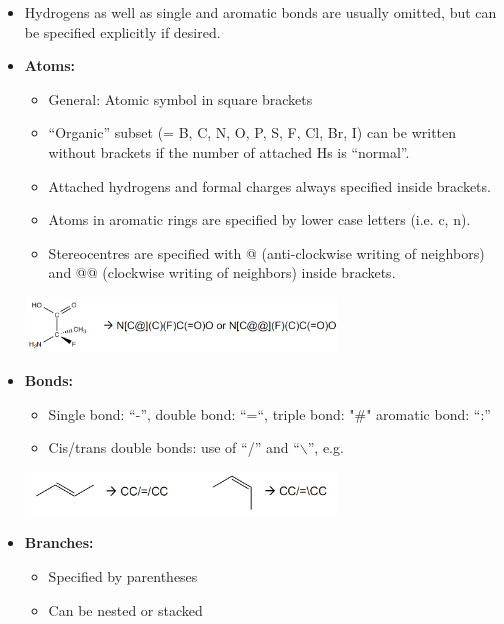 \begin{itemize}
    \item Hydrogens as well as single and aromatic bonds are usually omitted, but can be specified explicitly if desired.
    \item \textbf{Atoms:}
    \begin{itemize}
        \item General: Atomic symbol in square brackets
        \item “Organic” subset (= B, C, N, O, P, S, F, Cl, Br, I) can be written without brackets if the number of attached Hs is “normal”.
        \item Attached hydrogens and formal charges always specified inside brackets.
        \item Atoms in aromatic rings are specified by lower case letters (i.e. c, n).
        \item Stereocentres are specified with @ (anti-clockwise writing of neighbors) and @@ (clockwise writing of neighbors) inside brackets.
    \end{itemize}
    \begin{center}\includegraphics[width=0.65\textwidth]{img/cheminformatics/SmilesRulesAtoms.png}\end{center}
    \item \textbf{Bonds:}
    \begin{itemize}
        \item Single bond: “-”, double bond: “=“, triple bond: "\#" aromatic bond: “:”
        \item Cis/trans double bonds: use of “/” and “$\backslash$”, e.g.
    \end{itemize}
    \begin{center}\includegraphics[width=0.65\textwidth]{img/cheminformatics/SmilesRulesBonds.png}\end{center}
    \item \textbf{Branches:}
    \begin{itemize}
        \item Specified by parentheses
        \item Can be nested or stacked

\end{itemize}
\end{itemize}
